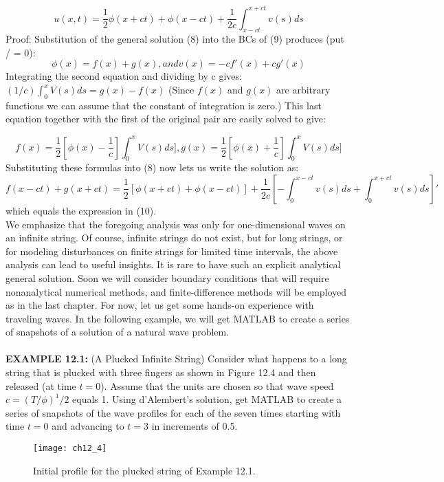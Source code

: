 \documentclass[../main.tex]{subfiles}
\begin{document}
\begin{equation}
u(x,t)=\dfrac{1}{2} \phi(x+ct)+\phi(x-ct)+\dfrac{1}{2c} \int_{x-ct}^{x+ct} v(s)ds
\label{eq:eps}
\end{equation}
Proof: Substitution of the general solution (8) into the BCs of (9) produces (put /
= 0): 
$$\phi(x)=f(x)+g(x), and v(x)=-cf'(x)+cg'(x)$$
Integrating the second equation and dividing by c gives:$(1/c) \int_{0}^{x} V(s)ds=g(x)-f(x)$
(Since $f(x)$ and $g(x)$ are arbitrary functions we can assume that the
constant of integration is zero.) This last equation together with the first of the
original pair are easily solved to give:

$$f(x)=\dfrac{1}{2}[\phi(x)-\dfrac{1}{c}] \int_{0}^{x} V(s)ds] , g(x)=\dfrac{1}{2}[\phi(x)+\dfrac{1}{c}] \int_{0}^{x} V(s)ds]$$
\newpage
Substituting these formulas into (8) now lets us write the solution as: 
$$f(x-ct) + g(x + ct)=\dfrac{1}{2} [\phi(x+ct)+\phi(x-ct)]+\dfrac{1}{2c} [-\int_{0}^{x-ct} v(s)ds+\int_{0}^{x+ct} v(s)ds]'$$
which equals the expression in (10). 
\\

We emphasize that the foregoing analysis was only for one-dimensional waves
on an infinite string. Of course, infinite strings do not exist, but for long strings, or
for modeling disturbances on finite strings for limited time intervals, the above
analysis can lead to useful insights. It is rare to have such an explicit analytical
general solution. Soon we will consider boundary conditions that will require
nonanalytical numerical methods, and finite-difference methods will be employed
as in the last chapter. For now, let us get some hands-on experience with
traveling waves. In the following example, we will get MATLAB to create a
series of snapshots of a solution of a natural wave problem.
\\
\\ 
\textbf{EXAMPLE 12.1:} (A Plucked Infinite String) Consider what happens to a long
string that is plucked with three fingers as shown in Figure 12.4 and then released
(at time $t = 0$). Assume that the units are chosen so that wave speed $c=(T/ \phi)^1/2$ equals 1. Using d'Alembert's solution, get MATLAB to create a series of
snapshots of the wave profiles for each of the seven times starting with time $t = 0$
and advancing to $t = 3$ in increments of 0.5. 
\begin{figure}[H]
	\centering
	\texttt{[image: ch12\_4]}
	\caption{\textsf{ Initial profile for the plucked string of Example 12.1.}}
	\label{pfig:ch12_4}
\end{figure}
\end{document}
